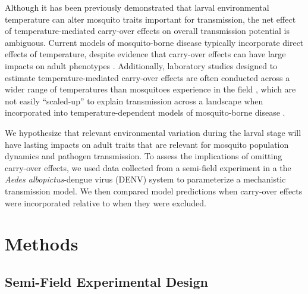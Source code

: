 \documentclass[12pt]{article}
\begin{document}
Although it has been previously demonstrated that larval environmental temperature can alter mosquito traits important for transmission, the net effect of temperature-mediated carry-over effects on overall transmission potential is ambiguous. Current models of mosquito-borne disease typically incorporate direct effects of temperature, despite evidence that carry-over effects can have large impacts on adult phenotypes \citep{muturi2011c, muturi2011a, price2015}. Additionally, laboratory studies designed to estimate temperature-mediated carry-over effects are often conducted across a wider range of temperatures than mosquitoes experience in the field \citep{cator2013}, which are not easily ``scaled-up'' to explain transmission across a landscape when incorporated into temperature-dependent models of mosquito-borne disease \citep{reiner2013}.

We hypothesize that relevant environmental variation during the larval stage will have lasting impacts on adult traits that are relevant for mosquito population dynamics and pathogen transmission. To assess the implications of omitting carry-over effects, we used data collected from a semi-field experiment in a the \textit{Aedes albopictus}-dengue virus (DENV) system to parameterize a mechanistic transmission model. We then compared model predictions when carry-over effects were incorporated relative to when they were excluded.

\section{Methods}
\subsection{Semi-Field Experimental Design}
\end{document}
